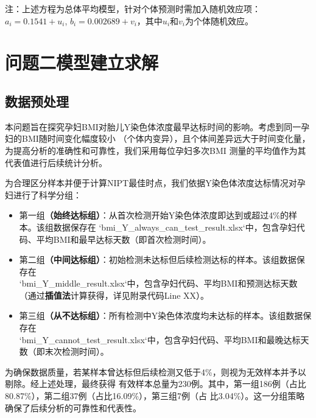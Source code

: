 \documentclass{article}
\begin{document}
注：上述方程为总体平均模型，针对个体预测时需加入随机效应项：$a_i = 0.1541 + u_i$, $b_i = 0.002689 + v_i$，其中$u_i$和$v_i$为个体随机效应。
\section{\textbf{问题二模型建立求解}}
\subsection{\textbf{数据预处理}}
本问题旨在探究孕妇BMI对胎儿Y染色体浓度最早达标时间的影响。考虑到同一孕妇的BMI随时间变化幅度较小
（个体内变异），且个体间差异远大于时间变化量，为提高分析的准确性和可靠性，我们采用每位孕妇多次BMI
测量的平均值作为其代表值进行后续统计分析。

为合理区分样本并便于计算NIPT最佳时点，我们依据Y染色体浓度达标情况对孕妇进行了科学分组：
\begin{itemize}
    \item 第一组\textbf{（始终达标组）}：从首次检测开始Y染色体浓度即达到或超过4\%的样本。该组数据保存在 `bmi\_Y\_always\_can\_test\_result.xlsx`中，包含孕妇代码、平均BMI和最早达标天数（即首次检测时间）。
    \item 第二组\textbf{（中间达标组）}：初始检测未达标但后续检测达标的样本。该组数据保存在 \\
          `bmi\_Y\_middle\_result.xlsx`中，包含孕妇代码、平均BMI和预测达标天数（通过\textbf{插值法}计算获得，详见附录代码Line XX）。
    \item 第三组\textbf{（从不达标组）}：所有检测中Y染色体浓度均未达标的样本。该组数据保存在 \\
          `bmi\_Y\_cannot\_test\_result.xlsx`中，包含孕妇代码、平均BMI和最晚达标天数（即末次检测时间）。
\end{itemize}

为确保数据质量，若某样本曾达标但后续检测又低于4\%，则视为无效样本并予以剔除。经上述处理，最终获得
有效样本总量为230例。其中，第一组186例（占比80.87\%），第二组37例（占比16.09\%），第三组7例（占
比3.04\%）。这一分组策略确保了后续分析的可靠性和代表性。
\end{document}
